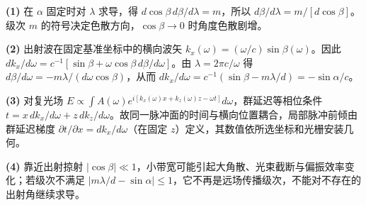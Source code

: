 \par\noindent\textbf{(1)} 在 \(\alpha\) 固定时对 \(\lambda\) 求导，得 \(d\cos\beta\,d\beta/d\lambda=m\)，所以 \(d\beta/d\lambda=m/[d\cos\beta]\)。级次 \(m\) 的符号决定色散方向，\(\cos\beta\to0\) 时角度色散剧增。
\par\noindent\textbf{(2)} 出射波在固定基准坐标中的横向波矢 \(k_x(\omega)=(\omega/c)\sin\beta(\omega)\)。因此 \(dk_x/d\omega=c^{-1}[\sin\beta+\omega\cos\beta\,d\beta/d\omega]\)。由 \(\lambda=2\pi c/\omega\) 得 \(d\beta/d\omega=-m\lambda/(d\omega\cos\beta)\)，从而 \(dk_x/d\omega=c^{-1}(\sin\beta-m\lambda/d)=-\sin\alpha/c\)。
\par\noindent\textbf{(3)} 对复光场 \(E\propto\int A(\omega)e^{i[k_x(\omega)x+k_z(\omega)z-\omega t]}d\omega\)，群延迟等相位条件 \(t=x\,dk_x/d\omega+z\,dk_z/d\omega\)。故同一脉冲面的时间与横向位置耦合，局部脉冲前倾由群延迟梯度 \(\partial t/\partial x=dk_x/d\omega\)（在固定 \(z\)）定义，其数值依所选坐标和光栅安装几何。
\par\noindent\textbf{(4)} 靠近出射掠射 \(|\cos\beta|\ll1\)，小带宽可能引起大角散、光束截断与偏振效率变化；若级次不满足 \(|m\lambda/d-\sin\alpha|\le1\)，它不再是远场传播级次，不能对不存在的出射角继续求导。
